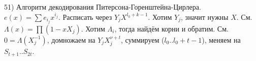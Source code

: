 51) Алгоритм декодирования Питерсона-Горенштейна-Цирлера.\\
$e(x)=\sum e_{i_j}x^{i_j}$.
Расписать через $Y_jX^{l_0+k-1}$. Хотим $Y_j$, значит нужны $X$.
См. $\Lambda(x)=\prod(1-xX_j)$. Хотим $\Lambda_i$, тогда найдём корни и обратим. См. $0=\Lambda(X_j^{-1})$, домножаем на $Y_jX_j^{\nu+t}$, суммируем ($l_0..l_0+t-1$), меняем на $S_{t+1}..S_{2t}$.
\\ 
